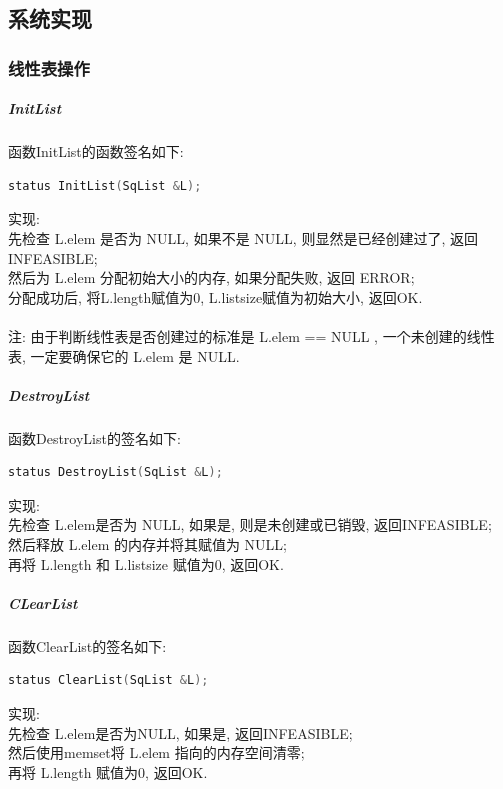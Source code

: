 \documentclass[supercite]{Experimental_Report}
\theoremstyle{definition}
\begin{document}
\subsection{系统实现}

\subsubsection{线性表操作}

\subparagraph{InitList}
\noindent
函数InitList的函数签名如下:
\begin{lstlisting}[language=C++, frame=single]
status InitList(SqList &L);
\end{lstlisting}

\noindent
实现: \\
先检查 L.elem 是否为 NULL, 如果不是 NULL, 则显然是已经创建过了, 返回 INFEASIBLE; \\
然后为 L.elem 分配初始大小的内存, 如果分配失败, 返回 ERROR; \\
分配成功后, 将L.length赋值为0, L.listsize赋值为初始大小, 返回OK. \\
\\
\noindent
注: 由于判断线性表是否创建过的标准是 L.elem == NULL , 一个未创建的线性表, 一定要确保它的 L.elem 是 NULL.\\

\subparagraph{DestroyList}
\noindent
函数DestroyList的签名如下:
\begin{lstlisting}[language=C++, frame=single]
status DestroyList(SqList &L);
\end{lstlisting}

\noindent
实现: \\
先检查 L.elem是否为 NULL, 如果是, 则是未创建或已销毁, 返回INFEASIBLE; \\
然后释放 L.elem 的内存并将其赋值为 NULL; \\
再将 L.length 和 L.listsize 赋值为0, 返回OK. \\

\subparagraph{CLearList}
\noindent
函数ClearList的签名如下:
\begin{lstlisting}[language=C++, frame=single]
status ClearList(SqList &L);
\end{lstlisting}

\noindent
实现: \\
先检查 L.elem是否为NULL, 如果是, 返回INFEASIBLE; \\
然后使用memset将 L.elem 指向的内存空间清零; \\
再将 L.length 赋值为0, 返回OK.\\
\end{document}
